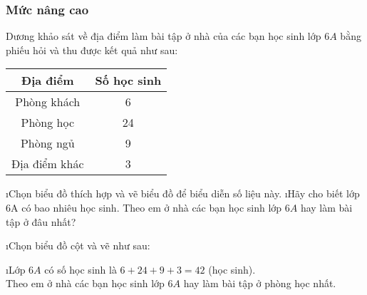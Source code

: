 \subsubsection*{Mức nâng cao}
\begin{bt}
	Dương khảo sát về địa điểm làm bài tập ở nhà của các bạn học sinh lớp $6A$ bằng phiếu hỏi và thu được kết quả như sau:
	\begin{center}
		\begin{tabular}{|c|c|}
			\hline
			Địa điểm&	Số học sinh\\
			\hline
			Phòng khách& 6 \\
			\hline	 
			Phòng học	&  24 \\
			\hline
			Phòng ngủ	 & 9 \\
			\hline
			Địa điểm khác&	 3 \\
			\hline
		\end{tabular}
	\end{center}
	\begin{enumerate}[a),leftmargin=*]
		\i Chọn biểu đồ thích hợp và vẽ biểu đồ để biểu diễn số liệu này.
		\i Hãy cho biết lớp 6A có bao nhiêu học sinh. Theo em ở nhà các bạn học sinh lớp $6A$ hay làm bài tập ở đâu nhất?
	\end{enumerate}
	\begin{loigiaichuong40}
		\begin{enumerate}[a),leftmargin=*]
			\i Chọn biểu đồ cột và vẽ như sau:
			
			\i Lớp $6A$ có số học sinh là $6 + 24 + 9 + 3 = 42$  (học sinh).\\
			Theo em ở nhà các bạn học sinh lớp $6A$ hay làm bài tập ở phòng học nhất.
		\end{enumerate}
	\end{loigiaichuong40}
\end{bt}
